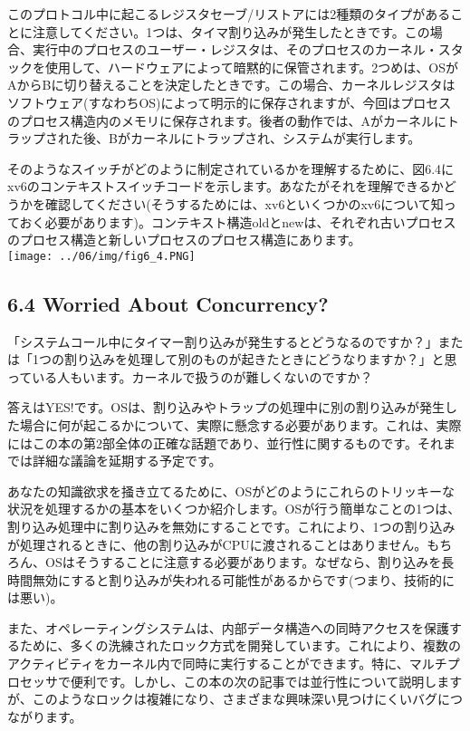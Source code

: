このプロトコル中に起こるレジスタセーブ/リストアには2種類のタイプがあることに注意してください。1つは、タイマ割り込みが発生したときです。この場合、実行中のプロセスのユーザー・レジスタは、そのプロセスのカーネル・スタックを使用して、ハードウェアによって暗黙的に保管されます。2つめは、OSがAからBに切り替えることを決定したときです。この場合、カーネルレジスタはソフトウェア(すなわちOS)によって明示的に保存されますが、今回はプロセスのプロセス構造内のメモリに保存されます。後者の動作では、Aがカーネルにトラップされた後、Bがカーネルにトラップされ、システムが実行します。

そのようなスイッチがどのように制定されているかを理解するために、図6.4にxv6のコンテキストスイッチコードを示します。あなたがそれを理解できるかどうかを確認してください(そうするためには、xv6といくつかのxv6について知っておく必要があります)。コンテキスト構造oldとnewは、それぞれ古いプロセスのプロセス構造と新しいプロセスのプロセス構造にあります。\\
\texttt{[image: ../06/img/fig6\_4.PNG]}

\hypertarget{worried-about-concurrency}{%
\subsection*{6.4 Worried About
Concurrency?}\label{worried-about-concurrency}}

「システムコール中にタイマー割り込みが発生するとどうなるのですか？」または「1つの割り込みを処理して別のものが起きたときにどうなりますか？」と思っている人もいます。カーネルで扱うのが難しくないのですか？

答えはYES!です。OSは、割り込みやトラップの処理中に別の割り込みが発生した場合に何が起こるかについて、実際に懸念する必要があります。これは、実際にはこの本の第2部全体の正確な話題であり、並行性に関するものです。それまでは詳細な議論を延期する予定です。

あなたの知識欲求を掻き立てるために、OSがどのようにこれらのトリッキーな状況を処理するかの基本をいくつか紹介します。OSが行う簡単なことの1つは、割り込み処理中に割り込みを無効にすることです。これにより、1つの割り込みが処理されるときに、他の割り込みがCPUに渡されることはありません。もちろん、OSはそうすることに注意する必要があります。なぜなら、割り込みを長時間無効にすると割り込みが失われる可能性があるからです(つまり、技術的には悪い)。

また、オペレーティングシステムは、内部データ構造への同時アクセスを保護するために、多くの洗練されたロック方式を開発しています。これにより、複数のアクティビティをカーネル内で同時に実行することができます。特に、マルチプロセッサで便利です。しかし、この本の次の記事では並行性について説明しますが、このようなロックは複雑になり、さまざまな興味深い見つけにくいバグにつながります。

